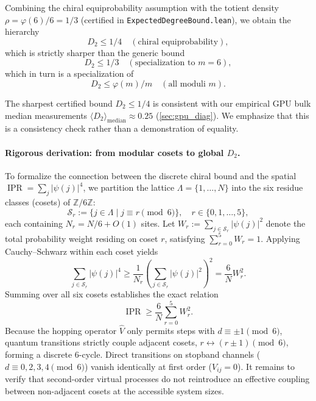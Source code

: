 \documentclass[11pt,a4paper]{article}
\newcommand{\Zmod}{\mathbb{Z}/6\mathbb{Z}}
\DeclareMathOperator{\IPR}{IPR}
\begin{document}
Combining the chiral equiprobability assumption with the totient density $\rho = \varphi(6)/6 = 1/3$ (certified in \texttt{ExpectedDegreeBound.lean}), we obtain the hierarchy
\begin{equation}
D_2 \le 1/4 \quad (\text{chiral equiprobability}),
\end{equation}
which is strictly sharper than the generic bound
\begin{equation}
D_2 \le 1/3 \quad (\text{specialization to } m=6),
\end{equation}
which in turn is a specialization of
\begin{equation}
D_2 \le \varphi(m)/m \quad (\text{all moduli } m).
\end{equation}

The sharpest certified bound $D_2 \le 1/4$ is consistent with our empirical GPU bulk median measurements $\langle D_2 \rangle_{\text{median}} \approx 0.25$ (\cref{sec:gpu_diag}). We emphasize that this is a consistency check rather than a demonstration of equality.

\paragraph{Rigorous derivation: from modular cosets to global $D_2$.}
To formalize the connection between the discrete chiral bound and the spatial $\IPR = \sum_j |\psi(j)|^4$, we partition the lattice $\Lambda = \{1, \dots, N\}$ into the six residue classes (cosets) of $\Zmod$:
\begin{equation}
\mathcal{S}_r := \{j \in \Lambda \mid j \equiv r \pmod 6\}, \quad r \in \{0, 1, \dots, 5\},
\end{equation}
each containing $N_r = N/6 + O(1)$ sites. Let $W_r := \sum_{j \in \mathcal{S}_r} |\psi(j)|^2$ denote the total probability weight residing on coset $r$, satisfying $\sum_{r=0}^5 W_r = 1$. Applying Cauchy--Schwarz within each coset yields
\begin{equation}
\sum_{j \in \mathcal{S}_r} |\psi(j)|^4 \ge \frac{1}{N_r}\left( \sum_{j \in \mathcal{S}_r} |\psi(j)|^2 \right)^2 = \frac{6}{N} W_r^2.
\end{equation}
Summing over all six cosets establishes the exact relation
\begin{equation}
\IPR \ge \frac{6}{N} \sum_{r=0}^5 W_r^2.
\label{eq:ipr_coset_bound}
\end{equation}
Because the hopping operator $\hat{V}$ only permits steps with
$d \equiv \pm 1 \pmod 6$, quantum transitions strictly couple adjacent
cosets, $r \leftrightarrow (r \pm 1) \pmod 6$, forming a discrete
6-cycle. Direct transitions on stopband channels
($d \equiv 0, 2, 3, 4 \pmod 6$) vanish identically at first order
($V_{ij} = 0$). It remains to verify that second-order virtual processes
do not reintroduce an effective coupling between non-adjacent cosets
at the accessible system sizes.
\end{document}
